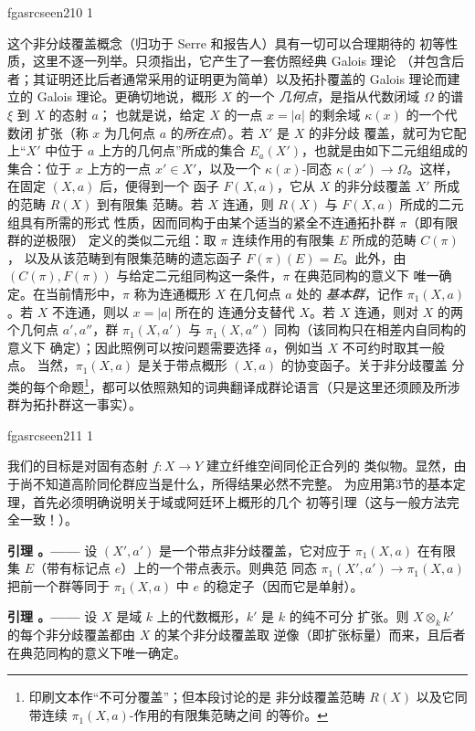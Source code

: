 \documentclass[12pt,twoside,openany]{book}
\numberwithin{equation}{section}
\newcommand{\fgaunitid}{unbound}
\newcommand{\src}[1]{%
  \phantomsection
  \hypertarget{src:\fgaunitid:#1}{}%
  \hypertarget{fga.\fgaunitid.p#1}{}%
  \ifcsname fgasrcseen#1\endcsname\else
    \expandafter\gdef\csname fgasrcseen#1\endcsname{1}%
    \hypertarget{src:#1}{}%
  \fi
  \marginpar{\raggedleft\footnotesize\sffamily #1}%
}
\newcommand{\fquote}[1]{“#1”}
\theoremstyle{plain}
\theoremstyle{definition}
\theoremstyle{remark}
\newcommand{\result}[2]{%
  \par\medskip\noindent\textbf{#1%
  \if\relax\detokenize{#2}\relax\else\space#2\fi。——}\enspace
}
\begin{document}
\src{210}
这个非分歧覆盖概念（归功于 Serre 和报告人）具有一切可以合理期待的
初等性质，这里不逐一列举。只须指出，它产生了一套仿照经典 Galois 理论
（并包含后者；其证明还比后者通常采用的证明更为简单）以及拓扑覆盖的
Galois 理论而建立的 Galois 理论。更确切地说，概形 $X$ 的一个
\emph{几何点}，是指从代数闭域 $\Omega$ 的谱 $\xi$ 到 $X$ 的态射 $a$；
也就是说，给定 $X$ 的一点 $x=|a|$ 的剩余域 $\kappa(x)$ 的一个代数闭
扩张（称 $x$ 为几何点 $a$ 的\emph{所在点}）。若 $X'$ 是 $X$ 的非分歧
覆盖，就可为它配上\fquote{$X'$ 中位于 $a$ 上方的几何点}所成的集合
$E_a(X')$，也就是由如下二元组组成的集合：位于 $x$ 上方的一点
$x'\in X'$，以及一个 $\kappa(x)$-同态
$\kappa(x')\longrightarrow\Omega$。这样，在固定 $(X,a)$ 后，便得到一个
函子 $F(X,a)$，它从 $X$ 的非分歧覆盖 $X'$ 所成的范畴 $R(X)$ 到有限集
范畴。若 $X$ 连通，则 $R(X)$ 与 $F(X,a)$ 所成的二元组具有所需的形式
性质，因而同构于由某个适当的紧全不连通拓扑群 $\pi$（即有限群的逆极限）
定义的类似二元组：取 $\pi$ 连续作用的有限集 $E$ 所成的范畴 $C(\pi)$，
以及从该范畴到有限集范畴的遗忘函子 $F(\pi)(E)=E$。此外，由
$(C(\pi),F(\pi))$ 与给定二元组同构这一条件，$\pi$ 在典范同构的意义下
唯一确定。在当前情形中，$\pi$ 称为连通概形 $X$ 在几何点 $a$ 处的
\emph{基本群}，记作 $\pi_1(X,a)$。若 $X$ 不连通，则以 $x=|a|$ 所在的
连通分支替代 $X$。若 $X$ 连通，则对 $X$ 的两个几何点 $a',a''$，群
$\pi_1(X,a')$ 与 $\pi_1(X,a'')$ 同构（该同构只在相差内自同构的意义下
确定）；因此照例可以按问题需要选择 $a$，例如当 $X$ 不可约时取其一般点。
当然，$\pi_1(X,a)$ 是关于带点概形 $(X,a)$ 的协变函子。关于非分歧覆盖
分类的每个命题\footnote{印刷文本作\fquote{不可分覆盖}；但本段讨论的是
非分歧覆盖范畴 $R(X)$ 以及它同带连续 $\pi_1(X,a)$-作用的有限集范畴之间
的等价。}，都可以依照熟知的词典翻译成群论语言（只是这里还须顾及所涉
群为拓扑群这一事实）。

\src{211}
我们的目标是对固有态射 $f:X\longrightarrow Y$ 建立纤维空间同伦正合列的
类似物。显然，由于尚不知道高阶同伦群应当是什么，所得结果必然不完整。
为应用第3节的基本定理，首先必须明确说明关于域或阿廷环上概形的几个
初等引理（这与一般方法完全一致！）。

\result{引理}{1} 设 $(X',a')$ 是一个带点非分歧覆盖，它对应于
$\pi_1(X,a)$ 在有限集 $E$（带有标记点 $e$）上的一个带点表示。则典范
同态 $\pi_1(X',a')\longrightarrow\pi_1(X,a)$ 把前一个群等同于
$\pi_1(X,a)$ 中 $e$ 的稳定子（因而它是单射）。

\result{引理}{2} 设 $X$ 是域 $k$ 上的代数概形，$k'$ 是 $k$ 的纯不可分
扩张。则 $X\otimes_k k'$ 的每个非分歧覆盖都由 $X$ 的某个非分歧覆盖取
逆像（即扩张标量）而来，且后者在典范同构的意义下唯一确定。
\end{document}

